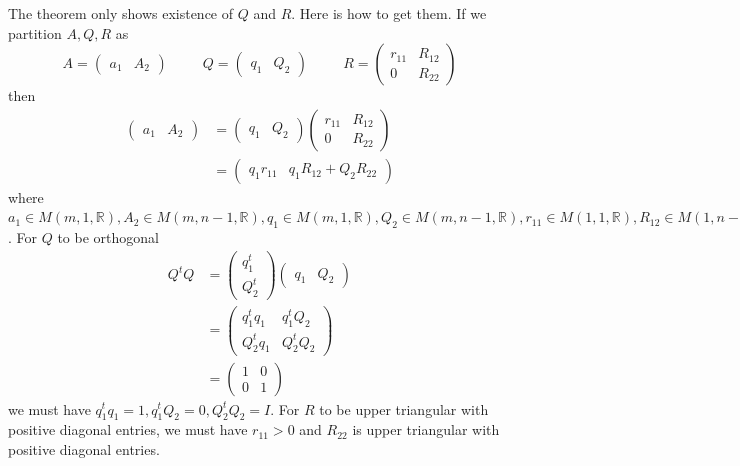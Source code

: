 \documentclass[12pt]{amsart}
\theoremstyle{definition}
\begin{document}
The theorem only shows existence of $Q$ and $R$. Here is how to get them. If we partition $A, Q, R$ as
$$A = \left(\begin{array}{cc} a_1 & A_2 \end{array}\right) \hspace{30pt} Q = \left(\begin{array}{cc} q_1 & Q_2 \end{array}\right) \hspace{30pt} R = \left(\begin{array}{cc} r_{11} & R_{12} \\ 0 & R_{22} \end{array}\right)$$
then
\begin{align*}
\left(\begin{array}{cc} a_1 & A_2 \end{array}\right) & = \left(\begin{array}{cc} q_1 & Q_2 \end{array}\right) \left(\begin{array}{cc} r_{11} & R_{12} \\ 0 & R_{22} \end{array}\right)\\
 & = \left(\begin{array}{cc} q_1r_{11} & q_1R_{12} + Q_2R_{22} \end{array}\right)
\end{align*}
where $a_1 \in M(m, 1, \mathbb{R}), A_2 \in M(m, n-1, \mathbb{R}), q_1 \in M(m, 1, \mathbb{R}), Q_2 \in M(m, n-1, \mathbb{R}), r_{11} \in M(1, 1, \mathbb{R}), R_{12} \in M(1, n-1, \mathbb{R}), R_{22} \in M(n-1, n-1, \mathbb{R})$. For $Q$ to be orthogonal
\begin{align*}
Q^tQ & = \left(\begin{array}{c} q_1^t \\ Q_2^t \end{array}\right) \left(\begin{array}{cc} q_1 & Q_2 \end{array}\right) \\
 & = \left(\begin{array}{cc} q_1^tq_1 & q_1^tQ_2 \\ Q_2^tq_1 & Q_2^tQ_2 \end{array}\right) \\
 & = \left(\begin{array}{cc} 1 & 0 \\ 0 & 1 \end{array}\right)
\end{align*}
we must have $q_1^tq_1 = 1, q_1^tQ_2 = 0, Q_2^tQ_2 = I$. For $R$ to be upper triangular with positive diagonal entries, we must have $r_{11} > 0$ and $R_{22}$ is upper triangular with positive diagonal entries.
\end{document}
